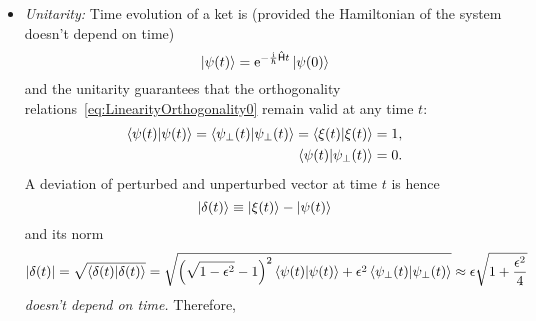 \documentclass[a4paper,11pt,twoside]{article}
\begin{document}
\begin{itemize}
            \item
                \emph{Unitarity:} Time evolution of a ket is (provided the Hamiltonian of the system doesn't depend on time)
                \begin{equation}
                    \left|{\psi(t)}\right\rangle=\operatorname{e}^{-\frac{\mathrm{i}}{\hbar}\mathsf{\hat{H}}t}\left|{\psi(0)}\right\rangle
                \end{equation}
                and the unitarity guarantees that the orthogonality relations~\eqref{eq:LinearityOrthogonality0} remain valid at any time $t$:
                \begin{align}
                    \left\langle{\psi(t)}\middle|{\psi(t)}\right\rangle=\left\langle{\psi_{\perp}(t)}\middle|{\psi_{\perp}(t)}\right\rangle=\left\langle{\xi(t)}\middle|{\xi(t)}\right\rangle=1,\nonumber\\
                    \label{eq:LinearityOrthogonality}
                    \left\langle{\psi(t)}\middle|{\psi_{\perp}(t)}\right\rangle=0.
                \end{align}
                A deviation of perturbed and unperturbed vector at time $t$ is hence
                \begin{equation}
                    \left|{\delta(t)}\right\rangle\equiv\left|{\xi(t)}\right\rangle-\left|{\psi(t)}\right\rangle
                \end{equation}
                and its norm
                \begin{equation}
                    \left|{\delta(t)}\right|
                        =\sqrt{\left\langle{\delta(t)}\middle|{\delta(t)}\right\rangle}
                        =\sqrt{\left(\sqrt{1-\epsilon^{2}}-1\right)^{2}\left\langle{\psi(t)}\middle|{\psi(t)}\right\rangle+\epsilon^{2}\left\langle{\psi_{\perp}(t)}\middle|{\psi_{\perp}(t)}\right\rangle}
                        \approx\epsilon\sqrt{1+\frac{\epsilon^{2}}{4}}
                \end{equation}
                \emph{doesn't depend on time.}
                Therefore, 
        \end{itemize}
\end{document}
